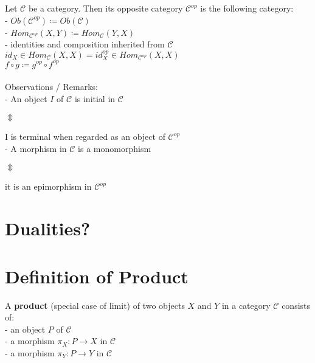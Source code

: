 \documentclass[a4paper, twoside, english, 11pt]{book}
\newcommand{\C}{\mathcal C}
\begin{document}
\noindent
Let $\C$ be a category. Then its opposite category $\C^{op}$ is the following category: \\

- $Ob(\C^{op}) \coloneqq Ob(\C)$ \\

- $Hom_{\C^{op}}(X, Y) \coloneqq Hom_\C(Y, X)$ \\

- identities and composition inherited from $\C$ \\
\indent\indent
$id_X \in Hom_\C(X, X) = id_X^{op} \in Hom_{\C^{op}}(X, X)$ \\
\indent\indent
$f \circ g \coloneqq g^{op} \circ f^{op}$ \\\\

\noindent
Observations / Remarks: \\

- An object $I$ of $\C$ is initial in $\C$

\indent\indent
$\Updownarrow$ %

\indent
I is terminal when regarded as an object of $\C^{op}$ \\

- A morphism in $\C$ is a monomorphism

\indent\indent
$\Updownarrow$ %

\indent
it is an epimorphism in $\C^{op}$ \\



\section{Dualities?}



\section{Definition of Product}

A \textbf{product} (special case of limit) of two objects $X$ and $Y$ in a category $\C$ consists of: \\

- an object $P$ of $\C$ \\

- a morphism $\pi_X : P \rightarrow X$ in $\C$ \\

- a morphism $\pi_Y : P \rightarrow Y$ in $\C$ \\
\end{document}
